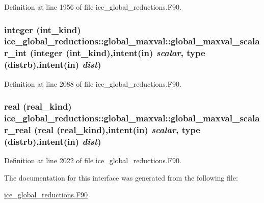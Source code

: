 Definition at line 1956 of file ice\_\-global\_\-reductions.F90.\hypertarget{interfaceice__global__reductions_1_1global__maxval_a9af5e401da9ac005625d02bf3cecebc1}{
\subsubsection[{global\_\-maxval\_\-scalar\_\-int}]{\setlength{\rightskip}{0pt plus 5cm}integer (int\_\-kind) ice\_\-global\_\-reductions::global\_\-maxval::global\_\-maxval\_\-scalar\_\-int (integer (int\_\-kind),intent(in) {\em scalar}, \/  type ({\bf distrb}),intent(in) {\em dist})}}
\label{interfaceice__global__reductions_1_1global__maxval_a9af5e401da9ac005625d02bf3cecebc1}


Definition at line 2088 of file ice\_\-global\_\-reductions.F90.\hypertarget{interfaceice__global__reductions_1_1global__maxval_a47b1976a64d47a897e2347bbe20a72bd}{
\subsubsection[{global\_\-maxval\_\-scalar\_\-real}]{\setlength{\rightskip}{0pt plus 5cm}real (real\_\-kind) ice\_\-global\_\-reductions::global\_\-maxval::global\_\-maxval\_\-scalar\_\-real (real (real\_\-kind),intent(in) {\em scalar}, \/  type ({\bf distrb}),intent(in) {\em dist})}}
\label{interfaceice__global__reductions_1_1global__maxval_a47b1976a64d47a897e2347bbe20a72bd}


Definition at line 2022 of file ice\_\-global\_\-reductions.F90.

The documentation for this interface was generated from the following file:\begin{DoxyCompactItemize}
\item 
\hyperlink{ice__global__reductions_8F90}{ice\_\-global\_\-reductions.F90}\end{DoxyCompactItemize}
